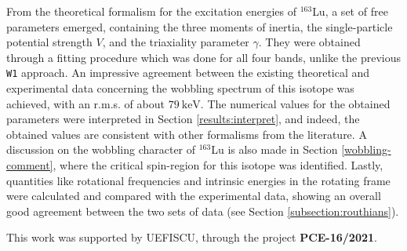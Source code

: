 \documentclass[myclassdoc,debug]{rjparticle}
\begin{document}
From the theoretical formalism for the excitation energies of $^{163}$Lu, a set of free parameters emerged, containing the three moments of inertia, the single-particle potential strength $V$, and the triaxiality parameter $\gamma$. They were obtained through a fitting procedure which was done for all four bands, unlike the previous \texttt{W1} approach. An impressive agreement between the existing theoretical and experimental data concerning the wobbling spectrum of this isotope was achieved, with an r.m.s. of about $79\ \text{keV}$. The numerical values for the obtained parameters were interpreted in Section \ref{results:interpret}, and indeed, the obtained values are consistent with other formalisms from the literature. A discussion on the wobbling character of $^{163}$Lu is also made in Section \ref{wobbling-comment}, where the critical spin-region for this isotope was identified. Lastly, quantities like rotational frequencies and intrinsic energies in the rotating frame were calculated and compared with the experimental data, showing an overall good agreement between the two sets of data (see Section \ref{subsection:routhians}).
\begin{acknowledgement}
This work was supported by UEFISCU, through the project \textbf{PCE-16/2021}.
\end{acknowledgement}
\end{document}
